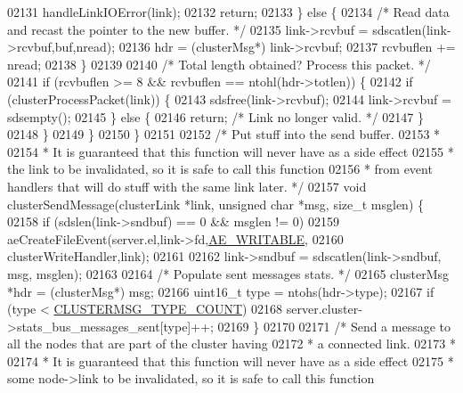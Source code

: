 \begin{DoxyCode}
{{{{{{{{{{{{{{{{{{{{{{{{{{{{{{{{{{{{{{02131             handleLinkIOError(link);
02132             \textcolor{keywordflow}{return};
02133         \} \textcolor{keywordflow}{else} \{
02134             \textcolor{comment}{/* Read data and recast the pointer to the new buffer. */}
02135             link->rcvbuf = sdscatlen(link->rcvbuf,buf,nread);
02136             hdr = (clusterMsg*) link->rcvbuf;
02137             rcvbuflen += nread;
02138         \}
02139 
02140         \textcolor{comment}{/* Total length obtained? Process this packet. */}
02141         \textcolor{keywordflow}{if} (rcvbuflen >= 8 && rcvbuflen == ntohl(hdr->totlen)) \{
02142             \textcolor{keywordflow}{if} (clusterProcessPacket(link)) \{
02143                 sdsfree(link->rcvbuf);
02144                 link->rcvbuf = sdsempty();
02145             \} \textcolor{keywordflow}{else} \{
02146                 \textcolor{keywordflow}{return}; \textcolor{comment}{/* Link no longer valid. */}
02147             \}
02148         \}
02149     \}
02150 \}
02151 
02152 \textcolor{comment}{/* Put stuff into the send buffer.}
02153 \textcolor{comment}{ *}
02154 \textcolor{comment}{ * It is guaranteed that this function will never have as a side effect}
02155 \textcolor{comment}{ * the link to be invalidated, so it is safe to call this function}
02156 \textcolor{comment}{ * from event handlers that will do stuff with the same link later. */}
02157 \textcolor{keywordtype}{void} clusterSendMessage(clusterLink *link, \textcolor{keywordtype}{unsigned} \textcolor{keywordtype}{char} *msg, size\_t msglen) \{
02158     \textcolor{keywordflow}{if} (sdslen(link->sndbuf) == 0 && msglen != 0)
02159         aeCreateFileEvent(server.el,link->fd,\hyperlink{ae_8h_ab6bfb0366ccb6277112d132c2a2bf500}{AE\_WRITABLE},
02160                     clusterWriteHandler,link);
02161 
02162     link->sndbuf = sdscatlen(link->sndbuf, msg, msglen);
02163 
02164     \textcolor{comment}{/* Populate sent messages stats. */}
02165     clusterMsg *hdr = (clusterMsg*) msg;
02166     uint16\_t type = ntohs(hdr->type);
02167     \textcolor{keywordflow}{if} (type < \hyperlink{cluster_8h_a6222c464c1f2125f42271d2abd63853e}{CLUSTERMSG\_TYPE\_COUNT})
02168         server.cluster->stats\_bus\_messages\_sent[type]++;
02169 \}
02170 
02171 \textcolor{comment}{/* Send a message to all the nodes that are part of the cluster having}
02172 \textcolor{comment}{ * a connected link.}
02173 \textcolor{comment}{ *}
02174 \textcolor{comment}{ * It is guaranteed that this function will never have as a side effect}
02175 \textcolor{comment}{ * some node->link to be invalidated, so it is safe to call this function}
}}}}}}}}}}}}}}}}}}}}}}}}}}}}}}}}}}}}}}
\end{DoxyCode}
